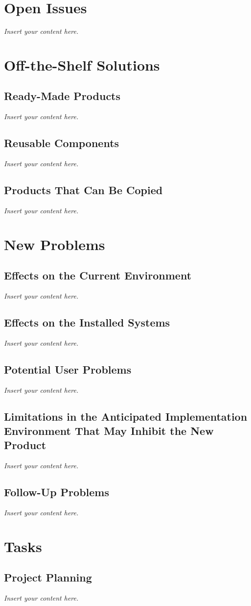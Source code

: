 \documentclass[12pt]{article}
\newcommand{\lips}{\textit{Insert your content here.}}
\begin{document}
\section{Open Issues}
\lips

\section{Off-the-Shelf Solutions}
\subsection{Ready-Made Products}
\lips
\subsection{Reusable Components}
\lips
\subsection{Products That Can Be Copied}
\lips

\section{New Problems}
\subsection{Effects on the Current Environment}
\lips
\subsection{Effects on the Installed Systems}
\lips
\subsection{Potential User Problems}
\lips
\subsection{Limitations in the Anticipated Implementation Environment That May
Inhibit the New Product}
\lips
\subsection{Follow-Up Problems}
\lips

\section{Tasks}
\subsection{Project Planning}
\lips
\end{document}
